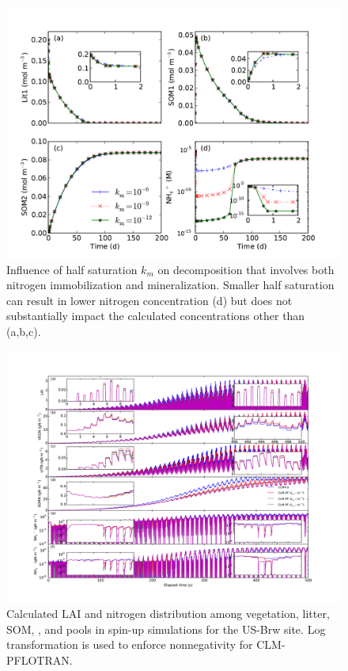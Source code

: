 \documentclass[gmd, manuscript]{copernicus}
\begin{document}
\begin{figure}[t]
\includegraphics[width=15cm]{../figs/fig09/figdecomp.pdf}
\caption{Influence of half saturation $k_m$ on decomposition that involves both
nitrogen immobilization and mineralization. Smaller half saturation can result
in lower nitrogen concentration (d) but does not substantially impact the
calculated concentrations other than  (a,b,c).}
\label{fig:decomp}
\end{figure}

\begin{figure}[t]
\includegraphics[width=1.0\textwidth]{../figs/fig10/brw500yl.pdf}
\caption{Calculated LAI and nitrogen distribution among vegetation, litter,
SOM, , and  pools in spin-up simulations for the US-Brw
site. Log transformation is used to enforce nonnegativity for CLM-PFLOTRAN.}
\label{fig:brw500yl}
\end{figure}
\end{document}
